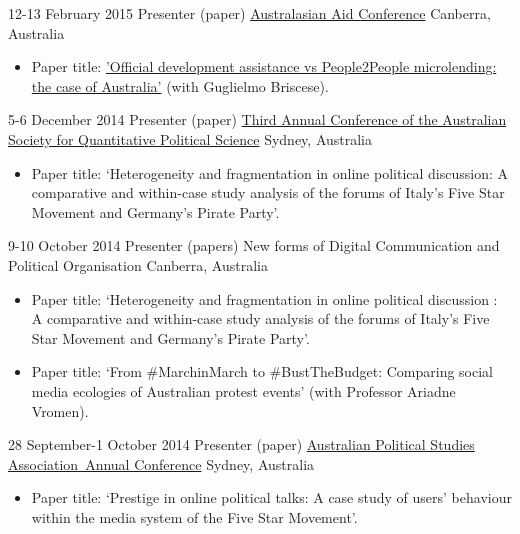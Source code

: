 \documentclass[11pt,a4paper,sans]{moderncv}
\begin{document}
    \cventry
        {12-13 February 2015} %
    {Presenter (paper)} %
    {\href{https://devpolicy.crawford.anu.edu.au/annual-australasian-aid-conference/2015}{Australasian Aid Conference}} %
    {Canberra, Australia} %
{}
    {
      \begin{itemize} %
        \item {Paper title:  \href{http://devpolicy.org/2015-Australasian-aid-conference/presentations/2b/Guglielmo-Briscese-and-Francesco-Bailo.pdf}{'Official development assistance vs People2People microlending: the case of Australia'} (with Guglielmo Briscese).} 
      \end{itemize}
    }

    \cventry
        {5-6 December 2014} %
    {Presenter (paper)} %
    {\href{http://www.asqps.org.au/index.php/asqps/2014"}{Third Annual Conference of the Australian Society for Quantitative Political Science}} %
    {Sydney, Australia} %
{}
    {
      \begin{itemize} %
        \item {Paper title: `Heterogeneity and fragmentation in online political discussion: A comparative and within-case study analysis of the forums of Italy's Five Star Movement and Germany's Pirate Party'.}
      \end{itemize}
    }

    \cventry
    {9-10 October 2014} %
    {Presenter (papers)} %
    {New forms of Digital Communication and Political Organisation} %
    {Canberra, Australia} %
    {}
    {
      \begin{itemize} %
        \item {Paper title: `Heterogeneity and fragmentation in online political discussion : A comparative and within-case study analysis of the forums of Italy's Five Star Movement and Germany’s Pirate Party'.}
         \item{Paper title: `From \#MarchinMarch to \#BustTheBudget: Comparing social media ecologies of Australian protest events' (with Professor Ariadne Vromen).}
      \end{itemize}
    }

    \cventry
        {28 September-1 October 2014} %
    {Presenter (paper)} %
    {\href{https://sites.google.com/site/apsa2014/home}{Australian Political Studies Association Annual Conference}} %
    {Sydney, Australia} %
{}
    {
      \begin{itemize} %
        \item {Paper title: `Prestige in online political talks: A case study of users' behaviour within the media system of the Five Star Movement'.}
      \end{itemize}
    }
\end{document}
